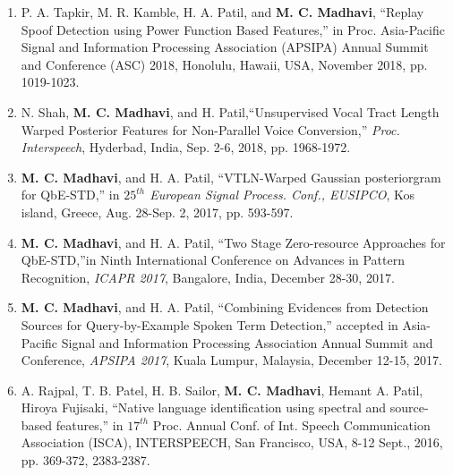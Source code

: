 \documentclass[10pt]{article}
\begin{document}
\begin{enumerate}[resume]
\item P. A. Tapkir, M. R. Kamble, H. A. Patil, and  \textbf{M. C. Madhavi}, ``Replay Spoof Detection using Power Function Based Features,'' in Proc. Asia-Pacific Signal and Information Processing Association (APSIPA) Annual Summit and Conference (ASC) 2018, Honolulu, Hawaii, USA, November 2018, pp. 1019-1023.
				
\item N. Shah, \textbf{M. C. Madhavi}, and H. Patil,``Unsupervised Vocal Tract Length Warped Posterior Features for Non-Parallel Voice Conversion,'' \textit{Proc. Interspeech}, Hyderbad, India, Sep. 2-6, 2018, pp. 1968-1972.
				
\item  \textbf{M. C. Madhavi}, and H. A. Patil, ``VTLN-Warped Gaussian posteriorgram for QbE-STD,'' in \textit{$25^{th}$ European	Signal Process. Conf., EUSIPCO}, Kos island, Greece, Aug. 28-Sep. 2, 2017, pp. 593-597.

\item \textbf{M. C. Madhavi}, and H. A. Patil, ``Two Stage Zero-resource Approaches for QbE-STD,''in Ninth International Conference on Advances in Pattern Recognition, \textit{ICAPR 2017}, Bangalore, India, December 28-30, 2017.





\item 	\textbf{M. C. Madhavi}, and H. A. Patil, ``Combining Evidences from Detection Sources for Query-by-Example Spoken Term Detection,'' accepted in Asia-Pacific Signal and Information Processing Association Annual Summit and Conference, \textit{APSIPA 2017}, Kuala Lumpur, Malaysia, December 12-15, 2017. 

\item A. Rajpal, T. B. Patel, H. B. Sailor, \textbf{M. C. Madhavi}, Hemant A. Patil, Hiroya Fujisaki, ``Native language identification using spectral and source-based features,''  in $ 17^{th} $ Proc. Annual  Conf. of Int. Speech Communication Association (ISCA), INTERSPEECH, San Francisco, USA, 8-12 Sept., 2016, pp. 369-372,  2383-2387.


\end{enumerate}
\end{document}
